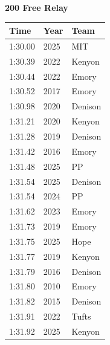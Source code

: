 \noindent\begin{minipage}[t]{0.98\textwidth}
\centering
\textbf{\textcolor{teamprimary}{200 Free Relay}}\par
\vspace{0.5em}
\centering
\small
\renewcommand{\arraystretch}{1.0}
\setlength{\tabcolsep}{4pt}
\begin{tabular}{@{}p{4.5cm}p{2.5cm}p{4.5cm}@{}}
\toprule
\textbf{Time} & \textbf{Year} & \textbf{Team} \\
\midrule
1:30.00 & 2025 & MIT \\
1:30.39 & 2022 & Kenyon \\
1:30.44 & 2022 & Emory \\
1:30.52 & 2017 & Emory \\
1:30.98 & 2020 & Denison \\
1:31.21 & 2020 & Kenyon \\
1:31.28 & 2019 & Denison \\
1:31.42 & 2016 & Emory \\
1:31.48 & 2025 & PP \\
1:31.54 & 2025 & Denison \\
1:31.54 & 2024 & PP \\
1:31.62 & 2023 & Emory \\
1:31.73 & 2019 & Emory \\
1:31.75 & 2025 & Hope \\
1:31.77 & 2019 & Kenyon \\
1:31.79 & 2016 & Denison \\
1:31.80 & 2010 & Emory \\
1:31.82 & 2015 & Denison \\
1:31.91 & 2022 & Tufts \\
1:31.92 & 2025 & Kenyon \\
\bottomrule
\end{tabular}
\end{minipage}
\vspace{1.2em}
